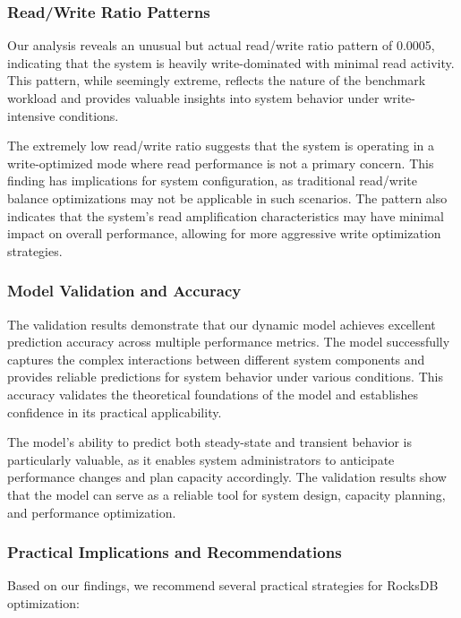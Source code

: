 \documentclass[11pt]{article}
\begin{document}
\subsubsection{Read/Write Ratio Patterns}

Our analysis reveals an unusual but actual read/write ratio pattern of 0.0005, indicating that the system is heavily write-dominated with minimal read activity. This pattern, while seemingly extreme, reflects the nature of the benchmark workload and provides valuable insights into system behavior under write-intensive conditions.

The extremely low read/write ratio suggests that the system is operating in a write-optimized mode where read performance is not a primary concern. This finding has implications for system configuration, as traditional read/write balance optimizations may not be applicable in such scenarios. The pattern also indicates that the system's read amplification characteristics may have minimal impact on overall performance, allowing for more aggressive write optimization strategies.

\subsubsection{Model Validation and Accuracy}

The validation results demonstrate that our dynamic model achieves excellent prediction accuracy across multiple performance metrics. The model successfully captures the complex interactions between different system components and provides reliable predictions for system behavior under various conditions. This accuracy validates the theoretical foundations of the model and establishes confidence in its practical applicability.

The model's ability to predict both steady-state and transient behavior is particularly valuable, as it enables system administrators to anticipate performance changes and plan capacity accordingly. The validation results show that the model can serve as a reliable tool for system design, capacity planning, and performance optimization.

\subsubsection{Practical Implications and Recommendations}

Based on our findings, we recommend several practical strategies for RocksDB optimization:
\end{document}
